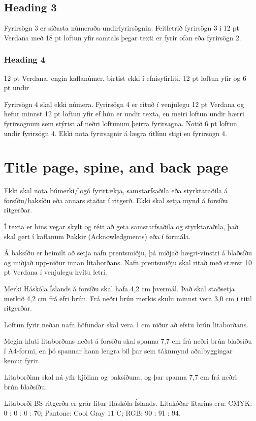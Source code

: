 \documentclass[a4paper,12pt,twoside,BCOR=10mm]{scrbook}
\begin{document}
\subsection{Heading 3}
Fyrirsögn 3 er síðasta númeraða undirfyrirsögnin. Feitletrið fyrirsögn 3 í 12 pt Verdana með 18 pt loftun yfir samtals þegar texti er fyrir ofan eða fyrirsögn 2. 
\subsubsection{Heading 4}
12 pt Verdana, engin kaflanúmer, birtist ekki í efnisyfirliti, 12 pt loftun yfir og 6 pt undir

Fyrirsögn 4 skal ekki númera. Fyrirsögn 4 er rituð í venjulegu 12 pt Verdana og hefur minnst 12 pt loftun yfir ef hún er undir texta, en meiri loftun undir hærri fyrirsögnum sem stýrist af neðri loftunum þeirra fyrirsagna. Notið 6 pt loftun undir fyrirsögn 4.
Ekki nota fyrirsagnir á lægra útlínu stigi en fyrirsögn 4.

\section{Title page, spine, and back page}
Ekki skal nota búmerki/logó fyrirtækja, samstarfsaðila eða styrktaraðila á forsíðu/baksíðu eða annars staðar í ritgerð. Ekki skal setja mynd á forsíðu ritgerðar. 

Í texta er hins vegar skylt og rétt að geta samstarfsaðila og styrktaraðila, það skal gert í kaflanum Þakkir (Acknowledgments) eða í formála.

Á baksíðu er heimilt að setja nafn prentsmiðju, þá miðjað hægri-vinstri á blaðsíðu og miðjað upp-niður innan litaborðans. Nafn prentsmiðju skal ritað með stærst 10 pt Verdana í venjulegu hvítu letri.

Merki Háskóla Íslands á forsíðu skal hafa 4,2 cm þvermál. Það skal staðsetja merkið 4,2 cm frá efri brún. Frá neðri brún merkis skulu minnst vera 3,0 cm í titil ritgerðar.

Loftun fyrir neðan nafn höfundar skal vera 1 cm niður að efstu brún litaborðans.

Megin hluti litaborðans neðst á forsíðu skal spanna 7,7 cm frá neðri brún blaðsíðu í A4-formi, en þó spannar hann lengra bil þar sem táknmynd aðalbyggingar kemur fyrir.

Litaborðinn skal ná yfir kjölinn og baksíðuna, og þar spanna 7,7 cm frá neðri brún blaðsíðu.

Litaborði BS ritgerða er grár litur Háskóla Íslands. Litakóðar litarins eru: CMYK: 0 : 0 : 0 : 70; Pantone: Cool Gray 11 C; RGB: 90 : 91 : 94.
\end{document}
